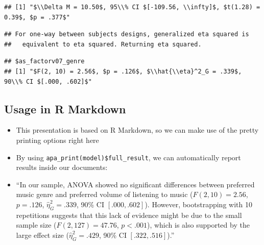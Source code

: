 \documentclass[
]{book}
\newenvironment{Shaded}{\begin{snugshade}}{\end{snugshade}}
\newcommand{\CommentTok}[1]{\textcolor[rgb]{0.56,0.35,0.01}{\textit{#1}}}
\newcommand{\FunctionTok}[1]{\textcolor[rgb]{0.13,0.29,0.53}{\textbf{#1}}}
\newcommand{\NormalTok}[1]{#1}
\newcommand{\SpecialCharTok}[1]{\textcolor[rgb]{0.81,0.36,0.00}{\textbf{#1}}}
\begin{document}
\begin{verbatim}
## [1] "$\\Delta M = 10.50$, 95\\% CI $[-109.56, \\infty]$, $t(1.28) = 0.39$, $p = .377$"
\end{verbatim}

\begin{Shaded}
\end{Shaded}

\begin{verbatim}
## For one-way between subjects designs, generalized eta squared is
##   equivalent to eta squared. Returning eta squared.
\end{verbatim}

\begin{verbatim}
## $as_factorv07_genre
## [1] "$F(2, 10) = 2.56$, $p = .126$, $\\hat{\\eta}^2_G = .339$, 90\\% CI $[.000, .602]$"
\end{verbatim}

\subsection{Usage in R Markdown}\label{usage-in-r-markdown}

\begin{itemize}
\item
  This presentation is based on R Markdown, so we can make use of the pretty printing options right here
\item
  By using \texttt{apa\_print(model)\$full\_result}, we can automatically report results inside our documents:
\item
  ``In our sample, ANOVA showed no significant differences between preferred music genre and preferred volume of listening to music (\(F(2, 10) = 2.56\), \(p = .126\), \(\hat{\eta}^2_G = .339\), 90\% CI \([.000, .602]\)). However, bootstrapping with 10 repetitions suggests that this lack of evidence might be due to the small sample size (\(F(2, 127) = 47.76\), \(p < .001\)), which is also supported by the large effect size (\(\hat{\eta}^2_G = .429\), 90\% CI \([.322, .516]\)).''
\end{itemize}
\end{document}
